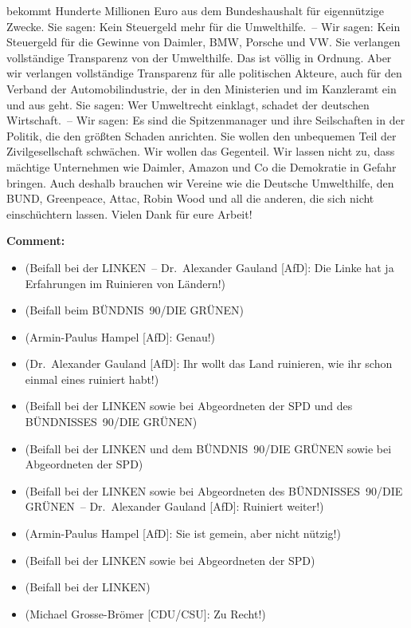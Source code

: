 \documentclass{article}
\begin{document}
bekommt Hunderte Millionen Euro aus dem Bundeshaushalt für eigennützige Zwecke. Sie sagen: Kein Steuergeld mehr für die Umwelthilfe. – Wir sagen: Kein Steuergeld für die Gewinne von Daimler, BMW, Porsche und VW.  Sie verlangen vollständige Transparenz von der Umwelthilfe. Das ist völlig in Ordnung. Aber wir verlangen vollständige Transparenz für alle politischen Akteure, auch für den Verband der Automobilindustrie, der in den Ministerien und im Kanzleramt ein und aus geht.  Sie sagen: Wer Umweltrecht einklagt, schadet der deutschen Wirtschaft. – Wir sagen: Es sind die Spitzenmanager und ihre Seilschaften in der Politik, die den größten Schaden anrichten.  Sie wollen den unbequemen Teil der Zivilgesellschaft schwächen. Wir wollen das Gegenteil. Wir lassen nicht zu, dass mächtige Unternehmen wie Daimler, Amazon und Co die Demokratie in Gefahr bringen. Auch deshalb brauchen wir Vereine wie die Deutsche Umwelthilfe, den BUND, Greenpeace, Attac, Robin Wood und all die anderen, die sich nicht einschüchtern lassen. Vielen Dank für eure Arbeit!  

\noindent\textbf{Comment:}
\begin{itemize}
    \setlength\itemsep{-3pt}
    \item (Beifall bei der LINKEN – Dr. Alexander Gauland [AfD]: Die Linke hat ja Erfahrungen im Ruinieren von Ländern!)
    \setlength\itemsep{-3pt}
    \item (Beifall beim BÜNDNIS 90/DIE GRÜNEN)
    \setlength\itemsep{-3pt}
    \item (Armin-Paulus Hampel [AfD]: Genau!)
    \setlength\itemsep{-3pt}
    \item (Dr. Alexander Gauland [AfD]: Ihr wollt das Land ruinieren, wie ihr schon einmal eines ruiniert habt!)
    \setlength\itemsep{-3pt}
    \item (Beifall bei der LINKEN sowie bei Abgeordneten der SPD und des BÜNDNISSES 90/DIE GRÜNEN)
    \setlength\itemsep{-3pt}
    \item (Beifall bei der LINKEN und dem BÜNDNIS 90/DIE GRÜNEN sowie bei Abgeordneten der SPD)
    \setlength\itemsep{-3pt}
    \item (Beifall bei der LINKEN sowie bei Abgeordneten des BÜNDNISSES 90/DIE GRÜNEN – Dr. Alexander Gauland [AfD]: Ruiniert weiter!)
    \setlength\itemsep{-3pt}
    \item (Armin-Paulus Hampel [AfD]: Sie ist gemein, aber nicht nützig!)
    \setlength\itemsep{-3pt}
    \item (Beifall bei der LINKEN sowie bei Abgeordneten der SPD)
    \setlength\itemsep{-3pt}
    \item (Beifall bei der LINKEN)
    \setlength\itemsep{-3pt}
    \item (Michael Grosse-Brömer [CDU/CSU]: Zu Recht!)
\end{itemize}
\end{document}
